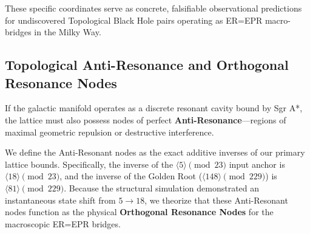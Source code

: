 \begin{table}[ht]
\centering
\renewcommand{\arraystretch}{1.2}
\caption{Top Real-World BlackHole Beacon anomalies filtered via Metareal geometric resonance. All candidates possess $PM=0.0$ and lock precisely into the $5 \pmod{23}$ invariant loop. J1909+1102 serves as the primary observational target for macroscopic ER=EPR tunneling.}
\label{tab:beacon_candidates}
\end{table}

These specific coordinates serve as concrete, falsifiable observational predictions for undiscovered Topological Black Hole pairs operating as ER=EPR macro-bridges in the Milky Way.

\subsection{Topological Anti-Resonance and Orthogonal Resonance Nodes}

If the galactic manifold operates as a discrete resonant cavity bound by Sgr A*, the lattice must also possess nodes of perfect \textbf{Anti-Resonance}—regions of maximal geometric repulsion or destructive interference. 

We define the Anti-Resonant nodes as the exact additive inverses of our primary lattice bounds. Specifically, the inverse of the $\langle 5 \rangle \pmod{23}$ input anchor is $\langle 18 \rangle \pmod{23}$, and the inverse of the Golden Root ($\langle 148 \rangle \pmod{229}$) is $\langle 81 \rangle \pmod{229}$. Because the structural simulation demonstrated an instantaneous state shift from $5 \to 18$, we theorize that these Anti-Resonant nodes function as the physical \textbf{Orthogonal Resonance Nodes} for the macroscopic ER=EPR bridges.


